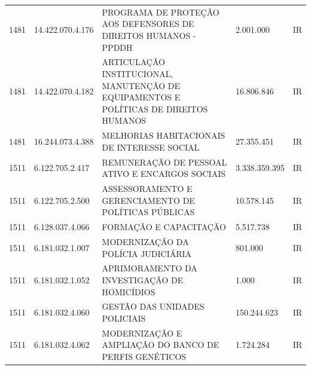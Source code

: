 \documentclass{article}
\begin{document}
\begin{longtable}[c]{m{1cm}|m{2cm}|m{10cm}|m{2cm}|m{1cm}}
\multicolumn{1}{C{1cm}|}{1481} & \multicolumn{1}{C{2cm}|}{14.422.070.4.176} & \multicolumn{1}{L{10cm}|}{PROGRAMA DE PROTEÇÃO AOS DEFENSORES DE DIREITOS HUMANOS - PPDDH} & \multicolumn{1}{R{2cm}|}{2.001.000} & \multicolumn{1}{C{1cm}}{IR} \\
\multicolumn{1}{C{1cm}|}{1481} & \multicolumn{1}{C{2cm}|}{14.422.070.4.182} & \multicolumn{1}{L{10cm}|}{ARTICULAÇÃO INSTITUCIONAL, MANUTENÇÃO DE EQUIPAMENTOS E POLÍTICAS DE DIREITOS HUMANOS} & \multicolumn{1}{R{2cm}|}{16.806.846} & \multicolumn{1}{C{1cm}}{IR} \\
\multicolumn{1}{C{1cm}|}{1481} & \multicolumn{1}{C{2cm}|}{16.244.073.4.388} & \multicolumn{1}{L{10cm}|}{MELHORIAS HABITACIONAIS DE INTERESSE SOCIAL} & \multicolumn{1}{R{2cm}|}{27.355.451} & \multicolumn{1}{C{1cm}}{IR} \\
\multicolumn{1}{C{1cm}|}{1511} & \multicolumn{1}{C{2cm}|}{6.122.705.2.417} & \multicolumn{1}{L{10cm}|}{REMUNERAÇÃO DE PESSOAL ATIVO E ENCARGOS SOCIAIS} & \multicolumn{1}{R{2cm}|}{3.338.359.395} & \multicolumn{1}{C{1cm}}{IR} \\
\multicolumn{1}{C{1cm}|}{1511} & \multicolumn{1}{C{2cm}|}{6.122.705.2.500} & \multicolumn{1}{L{10cm}|}{ASSESSORAMENTO E GERENCIAMENTO DE POLÍTICAS PÚBLICAS} & \multicolumn{1}{R{2cm}|}{10.578.145} & \multicolumn{1}{C{1cm}}{IR} \\
\multicolumn{1}{C{1cm}|}{1511} & \multicolumn{1}{C{2cm}|}{6.128.037.4.066} & \multicolumn{1}{L{10cm}|}{FORMAÇÃO E CAPACITAÇÃO} & \multicolumn{1}{R{2cm}|}{5.517.738} & \multicolumn{1}{C{1cm}}{IR} \\
\multicolumn{1}{C{1cm}|}{1511} & \multicolumn{1}{C{2cm}|}{6.181.032.1.007} & \multicolumn{1}{L{10cm}|}{MODERNIZAÇÃO DA POLÍCIA JUDICIÁRIA} & \multicolumn{1}{R{2cm}|}{801.000} & \multicolumn{1}{C{1cm}}{IR} \\
\multicolumn{1}{C{1cm}|}{1511} & \multicolumn{1}{C{2cm}|}{6.181.032.1.052} & \multicolumn{1}{L{10cm}|}{APRIMORAMENTO DA INVESTIGAÇÃO DE HOMICÍDIOS} & \multicolumn{1}{R{2cm}|}{1.000} & \multicolumn{1}{C{1cm}}{IR} \\
\multicolumn{1}{C{1cm}|}{1511} & \multicolumn{1}{C{2cm}|}{6.181.032.4.060} & \multicolumn{1}{L{10cm}|}{GESTÃO DAS UNIDADES POLICIAIS} & \multicolumn{1}{R{2cm}|}{150.244.623} & \multicolumn{1}{C{1cm}}{IR} \\
\multicolumn{1}{C{1cm}|}{1511} & \multicolumn{1}{C{2cm}|}{6.181.032.4.062} & \multicolumn{1}{L{10cm}|}{MODERNIZAÇÃO E AMPLIAÇÃO DO BANCO DE PERFIS GENÉTICOS} & \multicolumn{1}{R{2cm}|}{1.724.284} & \multicolumn{1}{C{1cm}}{IR} \\

\end{longtable}
\end{document}
